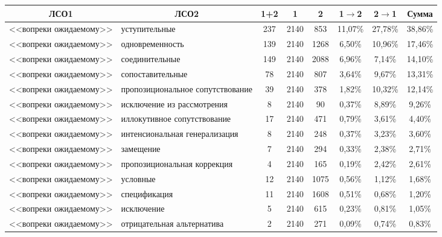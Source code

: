 \begin{multicols}{2}
\begin{table*}[b]\small %
\vspace*{-6pt}
\begin{center}
\vspace*{2ex}

\tabcolsep=4.3pt
\begin{tabular}{|c|l|c|c|c|c|c|c|}
\hline
\textbf{ЛСО1}&\multicolumn{1}{c|}{\textbf{ЛСО2}}&\textbf{1}\;+\;\textbf{2}&\textbf{1}&
\textbf{2}&\textbf{1}\;$\to$\;\textbf{2}&\textbf{2}\;$\to$\;\textbf{1}&\textbf{Сумма}\\
\hline
<<вопреки ожидаемому>>&уступительные&237\hphantom{9}&2140&853&11,07\%\hphantom{9}&27,78\%\hphantom{9}&38,86\%\hphantom{9}\\
<<вопреки ожидаемому>>&одновременность&139\hphantom{9}&2140&1268\hphantom{9}&6,50\%&10,96\%\hphantom{9}&17,46\%\hphantom{9}\\
<<вопреки ожидаемому>>&соединительные&149\hphantom{9}&2140&2088\hphantom{9}&6,96\%&7,14\%&14,10\%\hphantom{9}\\
<<вопреки ожидаемому>>&сопоставительные&78&2140&807&3,64\%&9,67\%&13,31\%\hphantom{9}\\
<<вопреки ожидаемому>>&пропозициональное 
сопутствование&39&2140&378&1,82\%&10,32\%\hphantom{9}&12,14\%\hphantom{9}\\
<<вопреки ожидаемому>>&исключение из 
рассмотрения&\hphantom{9}8&2140&\hphantom{9}90&0,37\%&8,89\%&9,26\%\\
<<вопреки ожидаемому>>&иллокутивное 
сопутствование&17&2140&471&0,79\%&3,61\%&4,40\%\\
<<вопреки ожидаемому>>&интенсиональная 
генерализация&\hphantom{9}8&2140&248&0,37\%&3,23\%&3,60\%\\
<<вопреки ожидаемому>>&замещение&\hphantom{9}7&2140&294&0,33\%&2,38\%&2,71\%\\
<<вопреки ожидаемому>>&пропозициональная 
коррекция&\hphantom{9}4&2140&165&0,19\%&2,42\%&2,61\%\\
<<вопреки ожидаемому>>&условные&12&2140&1075\hphantom{9}&0,56\%&1,12\%&1,68\%\\
<<вопреки ожидаемому>>&спецификация&11&2140&1608\hphantom{9}&0,51\%&0,68\%&1,20\%\\
<<вопреки ожидаемому>>&исключение&\hphantom{9}5&2140&615&0,23\%&0,81\%&1,05\%\\
<<вопреки ожидаемому>>&отрицательная 
альтернатива&\hphantom{9}2&2140&271&0,09\%&0,74\%&0,83\%\\

\end{tabular}
\end{center}
\end{table*}
\end{multicols}
